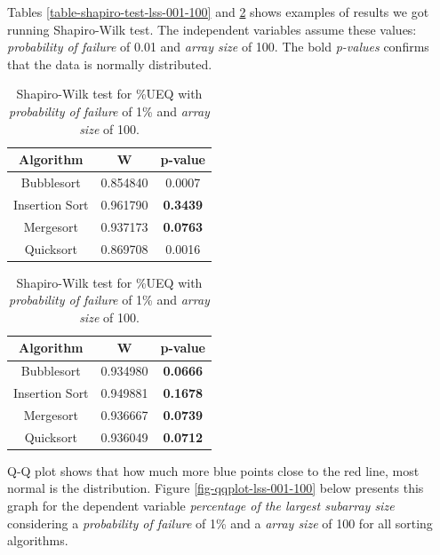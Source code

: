 Tables \ref{table-shapiro-test-lss-001-100} and \ref{table-shapiro-test-ueq-001-100} shows examples of results we got running Shapiro-Wilk test. The independent variables assume these values: \textit{probability of failure} of 0.01 and \textit{array size} of 100. The bold \textit{p-values} confirms that the data is normally distributed.

\begin{table}[H]
    \parbox{.45\linewidth}{
        \caption{Shapiro-Wilk test for \%LSS with \textit{probability of failure} of 1\% and \textit{array size} of 100.}
        \begin{center}
        \begin{tabular}{|c|c|c|}
        \hline
        \textbf{Algorithm} & \textbf{W} & \textbf{p-value} \\
        \hline
        Bubblesort & 0.854840 & 0.0007 \\
        \hline
        Insertion Sort & 0.961790 & \textbf{0.3439} \\
        \hline
        Mergesort & 0.937173 & \textbf{0.0763} \\
        \hline
        Quicksort & 0.869708 & 0.0016 \\
        \hline
        \end{tabular}
        \label{table-shapiro-test-lss-001-100}
        \end{center}
    }
    \hfill
    \parbox{.45\linewidth}{
        \caption{Shapiro-Wilk test for \%UEQ with \textit{probability of failure} of 1\% and \textit{array size} of 100.}
        \begin{center}
        \begin{tabular}{|c|c|c|}
        \hline
        \textbf{Algorithm} & \textbf{W} & \textbf{p-value} \\
        \hline
        Bubblesort & 0.934980 & \textbf{0.0666} \\
        \hline
        Insertion Sort & 0.949881 & \textbf{0.1678} \\
        \hline
        Mergesort & 0.936667 & \textbf{0.0739} \\
        \hline
        Quicksort & 0.936049 & \textbf{0.0712} \\
        \hline
        \end{tabular}
        \label{table-shapiro-test-ueq-001-100}
        \end{center}
    }
\end{table}

Q-Q plot shows that how much more blue points close to the red line, most normal is the distribution. Figure \ref{fig-qqplot-lss-001-100} below presents this graph for the dependent variable \textit{percentage of the largest subarray size} considering a \textit{probability of failure} of 1\% and a \textit{array size} of 100 for all sorting algorithms. 

